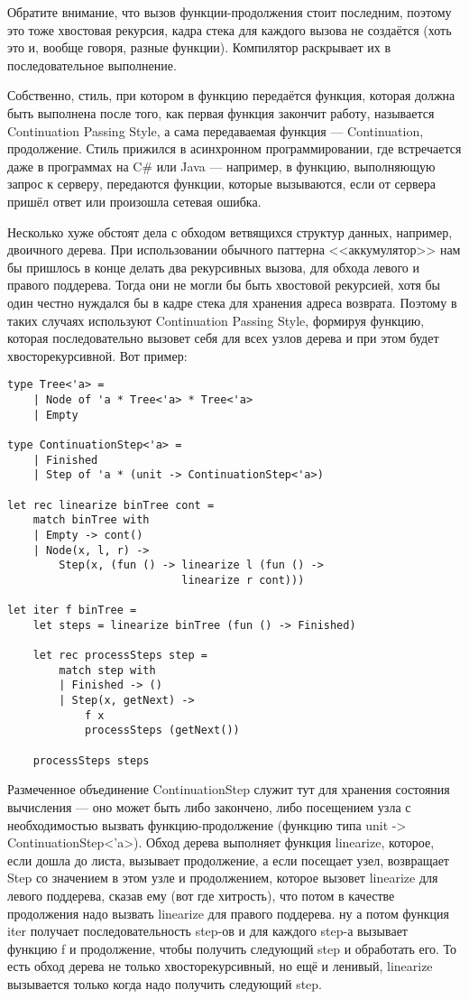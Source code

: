 \documentclass{../../text-style}
\begin{document}
Обратите внимание, что вызов функции-продолжения стоит последним, поэтому это тоже хвостовая рекурсия, кадра стека для каждого вызова не создаётся (хоть это и, вообще говоря, разные функции). Компилятор раскрывает их в последовательное выполнение.

Собственно, стиль, при котором в функцию передаётся функция, которая должна быть выполнена после того, как первая функция закончит работу, называется Continuation Passing Style, а сама передаваемая функция --- Continuation, продолжение. Стиль прижился в асинхронном программировании, где встречается даже в программах на C\# или Java --- например, в функцию, выполняющую запрос к серверу, передаются функции, которые вызываются, если от сервера пришёл ответ или произошла сетевая ошибка.

Несколько хуже обстоят дела с обходом ветвящихся структур данных, например, двоичного дерева. При использовании обычного паттерна <<аккумулятор>> нам бы пришлось в конце делать два рекурсивных вызова, для обхода левого и правого поддерева. Тогда они не могли бы быть хвостовой рекурсией, хотя бы один честно нуждался бы в кадре стека для хранения адреса возврата. Поэтому в таких случаях используют Continuation Passing Style, формируя функцию, которая последовательно вызовет себя для всех узлов дерева и при этом будет хвосторекурсивной. Вот пример:

\begin{verbatim}
type Tree<'a> =
    | Node of 'a * Tree<'a> * Tree<'a>
    | Empty

type ContinuationStep<'a> =
    | Finished
    | Step of 'a * (unit -> ContinuationStep<'a>)

let rec linearize binTree cont =
    match binTree with
    | Empty -> cont()
    | Node(x, l, r) ->
        Step(x, (fun () -> linearize l (fun () -> 
                           linearize r cont)))

let iter f binTree =
    let steps = linearize binTree (fun () -> Finished)

    let rec processSteps step =
        match step with
        | Finished -> ()
        | Step(x, getNext) -> 
            f x
            processSteps (getNext())
    
    processSteps steps
\end{verbatim}

Размеченное объединение ContinuationStep служит тут для хранения состояния вычисления --- оно может быть либо закончено, либо посещением узла с необходимостью вызвать функцию-продолжение (функцию типа unit -> ContinuationStep<'a>). Обход дерева выполняет функция linearize, которое, если дошла до листа, вызывает продолжение, а если посещает узел, возвращает Step со значением в этом узле и продолжением, которое вызовет linearize для левого поддерева, сказав ему (вот где хитрость), что потом в качестве продолжения надо вызвать linearize для правого поддерева. ну а потом функция iter получает последовательность step-ов и для каждого step-а вызывает функцию f и продолжение, чтобы получить следующий step и обработать его. То есть обход дерева не только хвосторекурсивный, но ещё и ленивый, linearize вызывается только когда надо получить следующий step.
\end{document}
